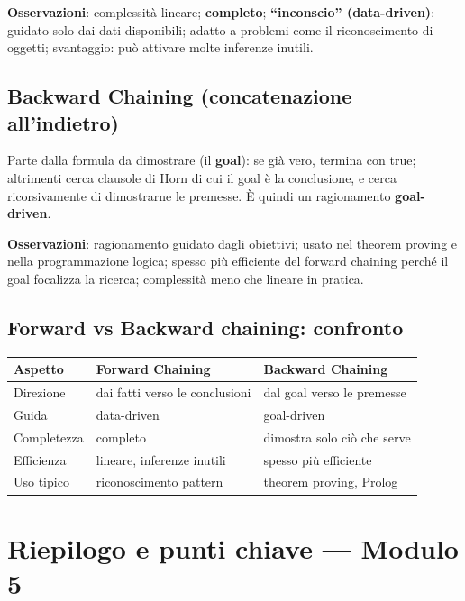 \documentclass[11pt,a4paper]{report}
\begin{document}
\textbf{Osservazioni}: complessità lineare; \textbf{completo}; \textbf{``inconscio'' (data-driven)}: guidato solo dai dati disponibili; adatto a problemi come il riconoscimento di oggetti; svantaggio: può attivare molte inferenze inutili.

\subsection*{Backward Chaining (concatenazione all'indietro)}

Parte dalla formula da dimostrare (il \textbf{goal}): se già vero, termina con true; altrimenti cerca clausole di Horn di cui il goal è la conclusione, e cerca ricorsivamente di dimostrarne le premesse. È quindi un ragionamento \textbf{goal-driven}.

\textbf{Osservazioni}: ragionamento guidato dagli obiettivi; usato nel theorem proving e nella programmazione logica; spesso più efficiente del forward chaining perché il goal focalizza la ricerca; complessità meno che lineare in pratica.

\subsection*{Forward vs Backward chaining: confronto}

\begin{center}
\begin{tabular}{@{}p{2.6cm}p{4.8cm}p{4.8cm}@{}}
\toprule
\textbf{Aspetto} & \textbf{Forward Chaining} & \textbf{Backward Chaining} \\
\midrule
Direzione & dai fatti verso le conclusioni & dal goal verso le premesse \\
Guida & data-driven & goal-driven \\
Completezza & completo & dimostra solo ciò che serve \\
Efficienza & lineare, inferenze inutili & spesso più efficiente \\
Uso tipico & riconoscimento pattern & theorem proving, Prolog \\
\bottomrule
\end{tabular}
\end{center}

\section*{Riepilogo e punti chiave --- Modulo 5}
\end{document}
